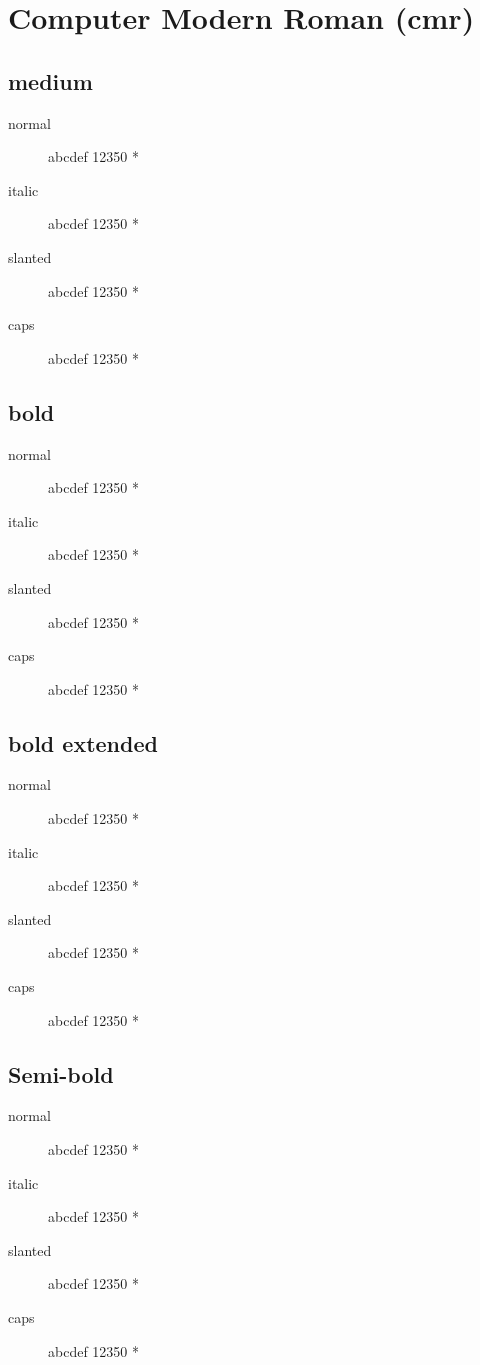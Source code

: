 \section{Computer Modern Roman (cmr)}

\subsection{medium}
\begin{description}
    \item [normal]  abcdef 12350 *
    \item [italic]  abcdef 12350 *
    \item [slanted]  abcdef 12350 *
    \item [caps]  abcdef 12350 *
\end{description}
    
\subsection{bold}
\begin{description}
    \item [normal]  abcdef 12350 *
    \item [italic]  abcdef 12350 *
    \item [slanted]  abcdef 12350 *
    \item [caps]  abcdef 12350 *
\end{description}
    
\subsection{bold extended}
\begin{description}
    \item [normal]  abcdef 12350 *
    \item [italic]  abcdef 12350 *
    \item [slanted]  abcdef 12350 *
    \item [caps]  abcdef 12350 *
\end{description}

\subsection{Semi-bold}
\begin{description}
    \item [normal]  abcdef 12350 *
    \item [italic]  abcdef 12350 *
    \item [slanted]  abcdef 12350 *
    \item [caps]  abcdef 12350 *
\end{description}

